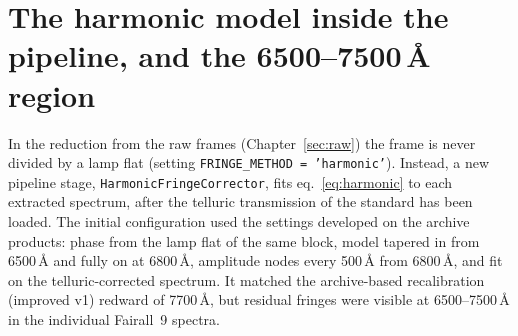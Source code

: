 \section{The harmonic model inside the pipeline, and the 6500--7500\,\AA{} region}
\label{sec:fringe_pipeline}
In the reduction from the raw frames (Chapter~\ref{sec:raw}) the frame is never divided by a lamp flat (setting
\texttt{FRINGE\_METHOD = 'harmonic'}). Instead, a new pipeline stage, \texttt{HarmonicFringeCorrector}, fits
eq.~\ref{eq:harmonic} to each extracted spectrum, after the telluric transmission of the standard has been loaded.
The initial configuration used the settings developed on the archive products: phase from the lamp flat of the same
block, model tapered in from 6500\,\AA{} and fully on at 6800\,\AA, amplitude nodes every 500\,\AA{} from
6800\,\AA, and fit on the telluric-corrected spectrum. It matched the archive-based recalibration (improved v1)
redward of 7700\,\AA, but residual fringes were visible at 6500--7500\,\AA{} in the individual Fairall~9 spectra.

